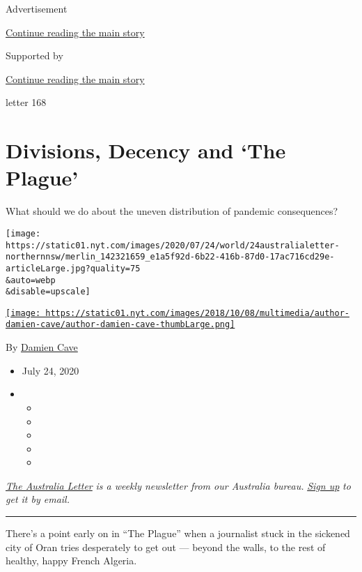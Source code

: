 Advertisement

\protect\hyperlink{after-top}{Continue reading the main story}

Supported by

\protect\hyperlink{after-sponsor}{Continue reading the main story}

letter 168

\hypertarget{divisions-decency-and-the-plague}{%
\section{Divisions, Decency and `The
Plague'}\label{divisions-decency-and-the-plague}}

What should we do about the uneven distribution of pandemic
consequences?

\texttt{[image: https://static01.nyt.com/images/2020/07/24/world/24australialetter-northernnsw/merlin\_142321659\_e1a5f92d-6b22-416b-87d0-17ac716cd29e-articleLarge.jpg?quality=75\\\&auto=webp\\\&disable=upscale]}

\href{https://www.nytimes.com/by/damien-cave}{\texttt{[image: https://static01.nyt.com/images/2018/10/08/multimedia/author-damien-cave/author-damien-cave-thumbLarge.png]}}

By \href{https://www.nytimes.com/by/damien-cave}{Damien Cave}

\begin{itemize}
\item
  July 24, 2020
\item
  \begin{itemize}
  \item
  \item
  \item
  \item
  \item
  \end{itemize}
\end{itemize}

\href{https://www.nytimes.com/series/nyt-australia-newsletter?module=inline}{\emph{The
Australia Letter}} \emph{is a weekly newsletter from our Australia
bureau.}
\href{https://www.nytimes.com/newsletters/australia-letter?module=inline}{\emph{Sign
up}} \emph{to get it by email.}

\begin{center}\rule{0.5\linewidth}{\linethickness}\end{center}

There's a point early on in ``The Plague'' when a journalist stuck in
the sickened city of Oran tries desperately to get out --- beyond the
walls, to the rest of healthy, happy French Algeria.

